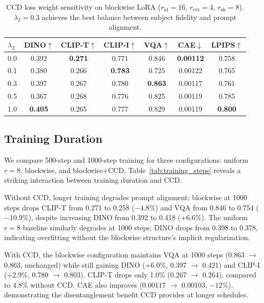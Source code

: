 \documentclass{article}
\begin{document}
\begin{table}[t]
\caption{CCD loss weight sensitivity on blockwise LoRA ($r_{\text{id}}{=}16$, $r_{\text{ctx}}{=}4$, $r_{\text{sh}}{=}8$).
$\lambda_2{=}0.3$ achieves the best balance between subject fidelity and prompt alignment.}
\label{tab:ccd_lambda}
\vskip 0.1in
\begin{center}
\begin{small}
\begin{tabular}{lcccccc}
\toprule
$\lambda_2$ & DINO$\uparrow$ & CLIP-T$\uparrow$ & CLIP-I$\uparrow$ & VQA$\uparrow$ & CAE$\downarrow$ & LPIPS$\uparrow$ \\
\midrule
0.0 & 0.392 & \textbf{0.271} & 0.771 & 0.846 & \textbf{0.00112} & 0.758 \\
0.1 & 0.380 & 0.266 & \textbf{0.783} & 0.725 & 0.00122 & 0.765 \\
0.3 & 0.397 & 0.267 & 0.780 & \textbf{0.863} & 0.00117 & 0.761 \\
0.5 & 0.367 & 0.268 & 0.776 & 0.825 & 0.00119 & 0.785 \\
1.0 & \textbf{0.405} & 0.265 & 0.777 & 0.829 & 0.00119 & \textbf{0.800} \\
\bottomrule
\end{tabular}
\end{small}
\end{center}
\vskip -0.1in
\end{table}

\subsection{Training Duration}
\label{sec:training_duration}

We compare 500-step and 1000-step training for three configurations: uniform $r{=}8$, blockwise, and blockwise+CCD.
Table~\ref{tab:training_steps} reveals a striking interaction between training duration and CCD.

Without CCD, longer training degrades prompt alignment: blockwise at 1000 steps drops CLIP-T from 0.271 to 0.258 ($-4.8\%$) and VQA from 0.846 to 0.754 ($-10.9\%$), despite increasing DINO from 0.392 to 0.418 ($+6.6\%$).
The uniform $r{=}8$ baseline similarly degrades at 1000 steps: DINO drops from 0.398 to 0.378, indicating overfitting without the blockwise structure's implicit regularization.

With CCD, the blockwise configuration maintains VQA at 1000 steps (0.863 $\to$ 0.863, unchanged) while still gaining DINO (+6.0\%, 0.397 $\to$ 0.421) and CLIP-I (+2.9\%, 0.780 $\to$ 0.803).
CLIP-T drops only 1.0\% (0.267 $\to$ 0.264), compared to 4.8\% without CCD.
CAE also improves (0.00117 $\to$ 0.00103, $-12\%$), demonstrating the disentanglement benefit CCD provides at longer schedules.
\end{document}
